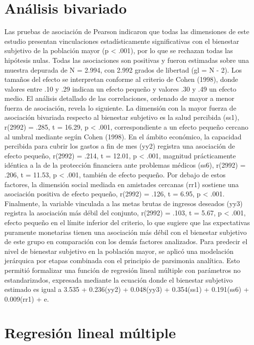 \documentclass[
  spanish,
  a4paper,
  oneside]{scrbook}
\begin{document}
\section{Análisis bivariado}\label{anuxe1lisis-bivariado}

Las pruebas de asociación de Pearson indicaron que todas las dimensiones
de este estudio presentan vinculaciones estadísticamente significativas
con el bienestar subjetivo de la población mayor (p \textless{} .001),
por lo que se rechazan todas las hipótesis nulas. Todas las asociaciones
son positivas y fueron estimadas sobre una muestra depurada de N =
2.994, con 2.992 grados de libertad (gl = N - 2). Los tamaños del efecto
se interpretan conforme al criterio de Cohen (1998), donde valores entre
.10 y .29 indican un efecto pequeño y valores .30 y .49 un efecto medio.
El análisis detallado de las correlaciones, ordenado de mayor a menor
fuerza de asociación, revela lo siguiente. La dimensión con la mayor
fuerza de asociación bivariada respecto al bienestar subjetivo es la
salud percibida (ss1), r(2992) = .285, t = 16.29, p \textless{} .001,
correspondiente a un efecto pequeño cercano al umbral mediante según
Cohen (1998). En el ámbito económico, la capacidad percibida para cubrir
los gastos a fin de mes (yy2) registra una asociación de efecto pequeño,
r(2992) = .214, t = 12.01, p \textless{} .001, magnitud prácticamente
idéntica a la de la protección financiera ante problemas médicos (ss6),
r(2992) = .206, t = 11.53, p \textless{} .001, también de efecto
pequeño. Por debajo de estos factores, la dimensión social mediada en
amistades cercanas (rr1) sostiene una asociación positiva de efecto
pequeño, r(2992) = .126, t = 6.95, p \textless{} .001. Finalmente, la
variable vinculada a las metas brutas de ingresos deseados (yy3)
registra la asociación más débil del conjunto, r(2992) = .103, t = 5.67,
p \textless{} .001, efecto pequeño en el límite inferior del criterio,
lo que sugiere que las expectativas puramente monetarias tienen una
asociación más débil con el bienestar subjetivo de este grupo en
comparación con los demás factores analizados. Para predecir el nivel de
bienestar subjetivo en la población mayor, se aplicó una modelación
jerárquica por etapas combinada con el principio de parsimonia
analítica. Esto permitió formalizar una función de regresión lineal
múltiple con parámetros no estandarizados, expresada mediante la
ecuación donde el bienestar subjetivo estimado es igual a 3.535 +
0.236(yy2) + 0.048(yy3) + 0.354(ss1) + 0.191(ss6) + 0.009(rr1) + e.

\section{Regresión lineal
múltiple}\label{regresiuxf3n-lineal-muxfaltiple}
\end{document}

